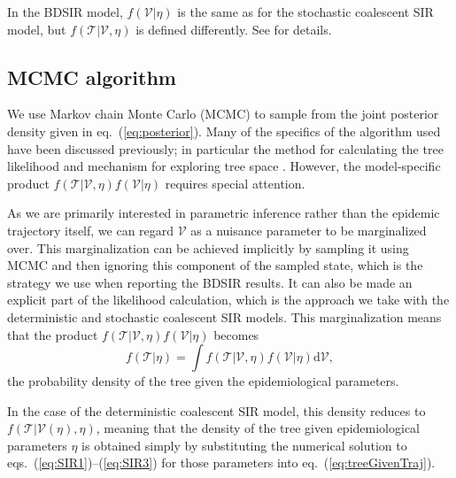 \documentclass[12pt,titlepage]{article}
\newcommand{\traj}{\mathcal{V}}
\newcommand{\tree}{\mathcal{T}}
\begin{document}
In the BDSIR model, $f(\traj|\eta)$ is the same as for the stochastic
coalescent SIR model, but $f(\tree|\traj,\eta)$ is defined
differently.  See \cite{Kuhnert:2014} for details.

\subsection{MCMC algorithm}

We use Markov chain Monte Carlo (MCMC) to sample from the joint
posterior density given in eq.~(\ref{eq:posterior}).  Many of the
specifics of the algorithm used have been discussed previously; in
particular the method for calculating the tree likelihood
\citep{Felsenstein:1981,Felsenstein:2004} and mechanism for exploring
tree space \citep{Drummond:2002}. However, the model-specific product
$f(\tree|\traj,\eta)f(\traj|\eta)$ requires special attention.

As we are primarily interested in parametric inference rather than the
epidemic trajectory itself, we can regard $\traj$ as a nuisance
parameter to be marginalized over. This marginalization can be
achieved implicitly by sampling it using MCMC and then ignoring this component of the sampled state, 
which is the strategy we use when reporting the BDSIR results. It can
also be made an explicit part of the likelihood calculation, which is the approach
we take with the deterministic and stochastic coalescent SIR
models. This marginalization means that the product
$f(\tree|\traj,\eta)f(\traj|\eta)$ becomes
\begin{equation}
f(\tree|\eta)=\int f(\tree|\traj,\eta)f(\traj|\eta)\mathrm{d}\traj,
\label{eq:treeprior}
\end{equation}
the probability density of the tree given the epidemiological parameters.

In the case of the deterministic coalescent SIR model, this density
reduces to $f(\tree|\traj(\eta),\eta)$, meaning that the density of
the tree given epidemiological parameters $\eta$ is obtained simply by
substituting the numerical solution to
eqs.~(\ref{eq:SIR1})--(\ref{eq:SIR3}) for those parameters into
eq.~(\ref{eq:treeGivenTraj}).
\end{document}
